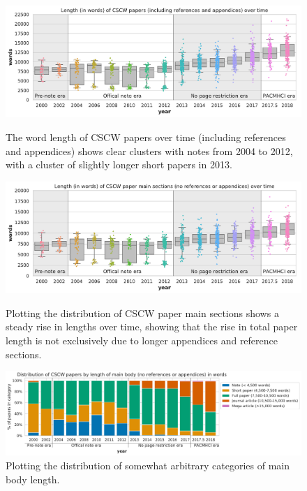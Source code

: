 \documentclass[format=acmsmall, screen=true]{acmart}
\begin{document}
\begin{figure}[h!]
  \includegraphics[width=1.04\textwidth]{figures/fig1-word-len-all.pdf}
  \vspace{-20px}
  \caption{The word length of CSCW papers over time (including references and appendices) shows clear clusters with notes from 2004 to 2012, with a cluster of slightly longer short papers in 2013.}
  \label{fig:word-len-all}
\vspace{20px}
  \includegraphics[width=1.04\textwidth]{figures/fig2-word-len-body.pdf}
 \vspace{-20px}
  \caption{Plotting the distribution of CSCW paper main sections shows a steady rise in lengths over time, showing that the rise in total paper length is not exclusively due to longer appendices and reference sections.}
  \label{fig:word-len-body}
  \vspace{20px}
  
  \includegraphics[width=1.04\textwidth]{figures/fig3-dist-len-cat.pdf}
  \caption{Plotting the distribution of somewhat arbitrary categories of main body length.}
  \label{fig:dist-len-cat}
\end{figure}
\end{document}
